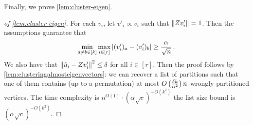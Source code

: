 Finally, we prove \cref{lem:cluster-eigen}.

\begin{proof}[of \cref{lem:cluster-eigen}]

    For each $v_i$, let $v'_i \propto v_i$ such that $\left\lVert Z v'_i\right\rVert = 1$.
    Then the assumptions guarantee that 
    \[\min_{a\neq b\in[k]}\max_{i \in [r]} \left\lvert(v'_i)_a- (v'_i)_b\right\rvert \geq \frac{\alpha}{\sqrt{n}}\,.\]
    We also have that $\left\lVert\hat{u}_i - Z v'_i\right\rVert^2 \leq \delta$ for all $i \in [r]$.
    Then the proof follows by \cref{lem:clusteringalmosteigenvectors}: we can recover a list of partitions such that one of them contains (up to a permutation) at most $O\left(\frac{\delta k}{\alpha^2}\right) n$ wrongly partitioned vertices.
    The time complexity is $n^{O(1)} \cdot (\alpha \sqrt{c})^{-O(k^2)}$ the list size bound is $(\alpha \sqrt{c})^{-O(k^2)}$.
\end{proof}
